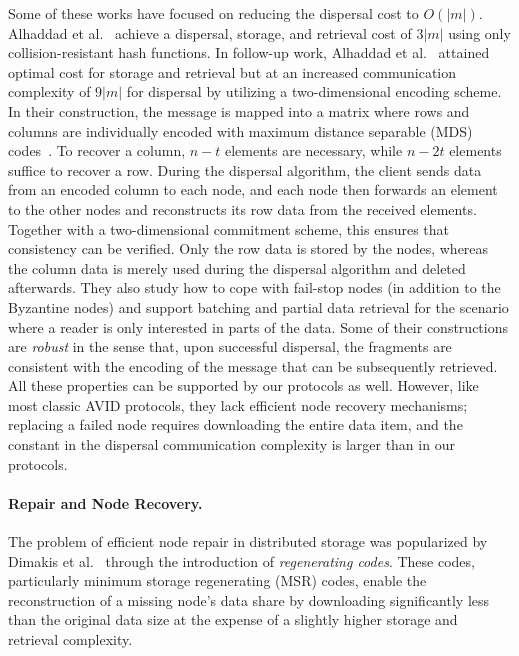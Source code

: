 \documentclass[sigconf,screen]{acmart}
\begin{document}
Some of these works have focused on reducing the dispersal cost to $O(|m|)$.
Alhaddad et al.~\cite{alhaddad2022} achieve a dispersal, storage, and retrieval cost of $3|m|$ using only collision-resistant hash functions.
In follow-up work, Alhaddad et al.~\cite{alhaddad2024} attained optimal cost for storage and retrieval but at an increased communication complexity of $9|m|$ for dispersal by utilizing a two-dimensional encoding scheme.
In their construction, the message is mapped into a matrix where rows and columns are individually encoded with maximum distance separable (MDS) codes~\cite{singleton1964}. To recover a column, $n-t$ elements are necessary, while $n-2t$ elements suffice to recover a row. 
During the dispersal algorithm, the client sends data from an encoded column to each node, and each node then forwards an element to the other nodes and reconstructs its row data from the received elements. Together with a two-dimensional commitment scheme, this ensures that consistency can be verified.
Only the row data is stored by the nodes, whereas the column data is merely used during the dispersal algorithm and deleted afterwards.
They also study how to cope with fail-stop nodes (in addition to the Byzantine nodes) and 
support batching and partial data retrieval for the scenario where a reader is only interested in parts of the data. %
Some of their constructions are \emph{robust} in the sense that, upon successful dispersal, the fragments are consistent with the encoding of the message that can be subsequently retrieved.
All these properties can be supported by our protocols as well. However, like most classic AVID protocols, they lack efficient node recovery mechanisms; replacing a failed node requires downloading the entire data item, and the constant in the dispersal communication complexity is larger than in our protocols.

\paragraph*{Repair and Node Recovery.} 
The problem of efficient node repair in distributed storage was popularized by Dimakis et al.~\cite{dimakis2010} through the introduction of \emph{regenerating codes}. 
These codes, particularly minimum storage regenerating (MSR) codes, enable the reconstruction of a missing node's data share by downloading significantly less than the original data size at the expense of a slightly higher storage and retrieval complexity.
\end{document}

